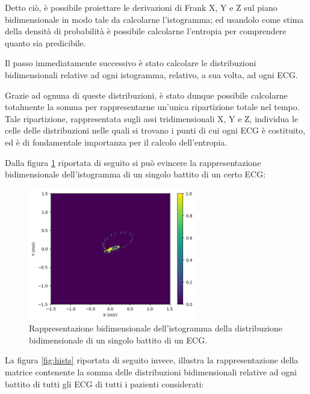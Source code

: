 Detto ciò, è possibile proiettare le derivazioni di Frank X, Y e Z sul piano bidimensionale in modo tale da calcolarne l'istogramma; ed usandolo come stima della densità di probabilità è possibile calcolarne l'entropia per comprendere quanto sia predicibile.

Il passo immediatamente successivo è stato calcolare le distribuzioni bidimensionali relative ad ogni istogramma, relativo, a sua volta, ad ogni ECG.

Grazie ad ognuna di queste distribuzioni, è stato dunque possibile calcolarne totalmente la somma per rappresentarne un'unica ripartizione totale nel tempo. Tale ripartizione, rappresentata sugli assi tridimensionali X, Y e Z, individua le celle delle distribuzioni nelle quali si trovano i punti di cui ogni ECG è costituito, ed è di fondamentale importanza per il calcolo dell'entropia.

Dalla figura \ref{fig:hist} riportata di seguito si può evincere la rappresentazione bidimensionale dell'istogramma di un singolo battito di un certo ECG:

\begin{figure}[H]
    \centering
    \includegraphics[width=0.65\textwidth]{immagini/hist.png}
    \captionsetup{justification=centering}
    \caption{Rappresentazione bidimensionale dell'istogramma della distribuzione bidimensionale di un singolo battito di un ECG.}
    \label{fig:hist}
\end{figure}

La figura \ref{fig:hists} riportata di seguito invece, illustra la rappresentazione della matrice contenente la somma delle distribuzioni bidimensionali relative ad ogni battito di tutti gli ECG di tutti i pazienti considerati:

